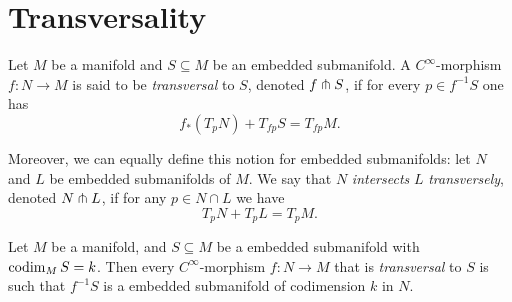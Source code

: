 \section{Transversality}

\begin{definition}
    \label{def:transversal-smooth-morphism}
    Let \(M\) be a manifold and \(S \subseteq M\) be an embedded submanifold. A
    \(C^{\infty}\)-morphism \(f: N \to M\) is said to be \emph{transversal} to
    \(S\), denoted \(f \pitchfork S\), if for every \(p \in f^{-1} S\) one has
    \[
        f_{*}(T_p N) + T_{f p} S = T_{f p} M.
    \]

    Moreover, we can equally define this notion for embedded submanifolds: let \(N\)
    and \(L\) be embedded submanifolds of \(M\). We say that \(N\) \emph{intersects}
    \(L\) \emph{transversely}, denoted \(N \pitchfork L\), if for any \(p \in N \cap L\)
    we have
    \[
        T_p N + T_p L = T_p M.
    \]
\end{definition}

\begin{theorem}[Transversality]
    \label{thm:transversality-theorem}
    Let \(M\) be a manifold, and \(S \subseteq M\) be a embedded submanifold with
    \(\operatorname{codim}_M S = k\). Then every \(C^{\infty}\)-morphism \(f: N \to M\) that is
    \emph{transversal} to \(S\) is such that \(f^{-1} S\) is a embedded submanifold
    of codimension \(k\) in \(N\).
\end{theorem}

